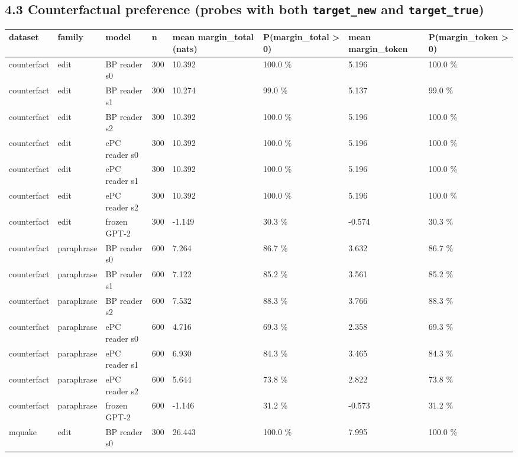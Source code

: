 \documentclass[10pt,a4paper]{article}
\begin{document}
\subsection*{4.3 Counterfactual preference (probes with both \texttt{target\_new} and \texttt{target\_true})}



\begin{center}\scriptsize
\begin{tabularx}{\textwidth}{@{}p{}XXXXXXX@{}}
\toprule
dataset & family & model & n & mean margin\_total (nats) & P(margin\_total > 0) & mean margin\_token & P(margin\_token > 0) \\ \midrule
counterfact & edit & BP reader s0 & 300 & 10.392 & 100.0 \% & 5.196 & 100.0 \% \\
counterfact & edit & BP reader s1 & 300 & 10.274 & 99.0 \% & 5.137 & 99.0 \% \\
counterfact & edit & BP reader s2 & 300 & 10.392 & 100.0 \% & 5.196 & 100.0 \% \\
counterfact & edit & ePC reader s0 & 300 & 10.392 & 100.0 \% & 5.196 & 100.0 \% \\
counterfact & edit & ePC reader s1 & 300 & 10.392 & 100.0 \% & 5.196 & 100.0 \% \\
counterfact & edit & ePC reader s2 & 300 & 10.392 & 100.0 \% & 5.196 & 100.0 \% \\
counterfact & edit & frozen GPT-2 & 300 & -1.149 & 30.3 \% & -0.574 & 30.3 \% \\
counterfact & paraphrase & BP reader s0 & 600 & 7.264 & 86.7 \% & 3.632 & 86.7 \% \\
counterfact & paraphrase & BP reader s1 & 600 & 7.122 & 85.2 \% & 3.561 & 85.2 \% \\
counterfact & paraphrase & BP reader s2 & 600 & 7.532 & 88.3 \% & 3.766 & 88.3 \% \\
counterfact & paraphrase & ePC reader s0 & 600 & 4.716 & 69.3 \% & 2.358 & 69.3 \% \\
counterfact & paraphrase & ePC reader s1 & 600 & 6.930 & 84.3 \% & 3.465 & 84.3 \% \\
counterfact & paraphrase & ePC reader s2 & 600 & 5.644 & 73.8 \% & 2.822 & 73.8 \% \\
counterfact & paraphrase & frozen GPT-2 & 600 & -1.146 & 31.2 \% & -0.573 & 31.2 \% \\
mquake & edit & BP reader s0 & 300 & 26.443 & 100.0 \% & 7.995 & 100.0 \% \\

\end{tabularx}
\end{center}
\end{document}
